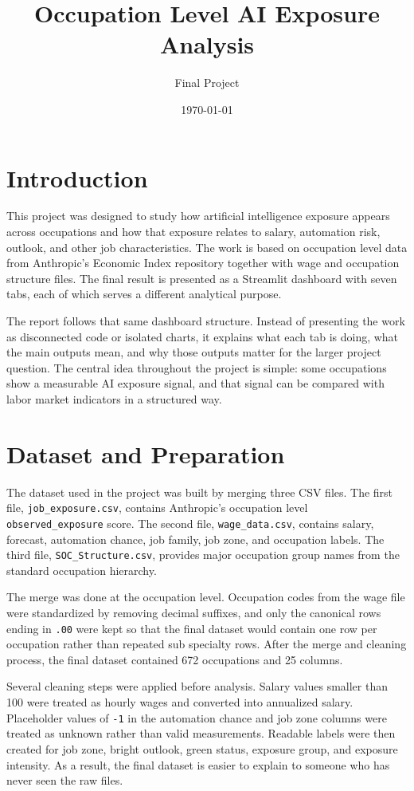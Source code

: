 \documentclass[11pt]{article}
\title{Occupation Level AI Exposure Analysis}
\author{Final Project}
\date{\today}
\begin{document}
\maketitle

\section*{Introduction}

This project was designed to study how artificial intelligence exposure appears across occupations and how that exposure relates to salary, automation risk, outlook, and other job characteristics. The work is based on occupation level data from Anthropic's Economic Index repository together with wage and occupation structure files. The final result is presented as a Streamlit dashboard with seven tabs, each of which serves a different analytical purpose.

The report follows that same dashboard structure. Instead of presenting the work as disconnected code or isolated charts, it explains what each tab is doing, what the main outputs mean, and why those outputs matter for the larger project question. The central idea throughout the project is simple: some occupations show a measurable AI exposure signal, and that signal can be compared with labor market indicators in a structured way.

\section*{Dataset and Preparation}

The dataset used in the project was built by merging three CSV files. The first file, \texttt{job\_exposure.csv}, contains Anthropic's occupation level \texttt{observed\_exposure} score. The second file, \texttt{wage\_data.csv}, contains salary, forecast, automation chance, job family, job zone, and occupation labels. The third file, \texttt{SOC\_Structure.csv}, provides major occupation group names from the standard occupation hierarchy.

The merge was done at the occupation level. Occupation codes from the wage file were standardized by removing decimal suffixes, and only the canonical rows ending in \texttt{.00} were kept so that the final dataset would contain one row per occupation rather than repeated sub specialty rows. After the merge and cleaning process, the final dataset contained 672 occupations and 25 columns.

Several cleaning steps were applied before analysis. Salary values smaller than 100 were treated as hourly wages and converted into annualized salary. Placeholder values of \texttt{-1} in the automation chance and job zone columns were treated as unknown rather than valid measurements. Readable labels were then created for job zone, bright outlook, green status, exposure group, and exposure intensity. As a result, the final dataset is easier to explain to someone who has never seen the raw files.
\end{document}
